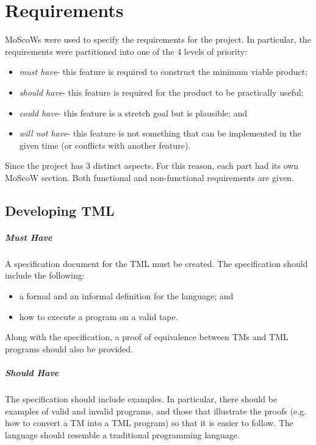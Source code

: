 \chapter{Requirements}

MoScoWs were used to specify the requirements for the project. In particular, the requirements were partitioned into one of the 4 levels of priority:
\begin{itemize}
    \item \emph{must have}- this feature is required to construct the minimum viable product; 
    \item \emph{should have}- this feature is required for the product to be practically useful;
    \item \emph{could have}- this feature is a stretch goal but is plausible; and
    \item \emph{will not have}- this feature is not something that can be implemented in the given time (or conflicts with another feature).
\end{itemize} 
Since the project has 3 distinct aspects. For this reason, each part had its own MoScoW section. Both functional and non-functional requirements are given.

\section{Developing TML}

\paragraph{Must Have} A specification document for the TML must be created. The specification should include the following:
\begin{itemize}
    \item a formal and an informal definition for the language; and
    \item how to execute a program on a valid tape.
\end{itemize}
Along with the specification, a proof of equivalence between TMs and TML programs should also be provided.

\paragraph{Should Have} The specification should include examples. In particular, there should be examples of valid and invalid programs, and those that illustrate the proofs (e.g. how to convert a TM into a TML program) so that it is easier to follow. The language should resemble a traditional programming language.

